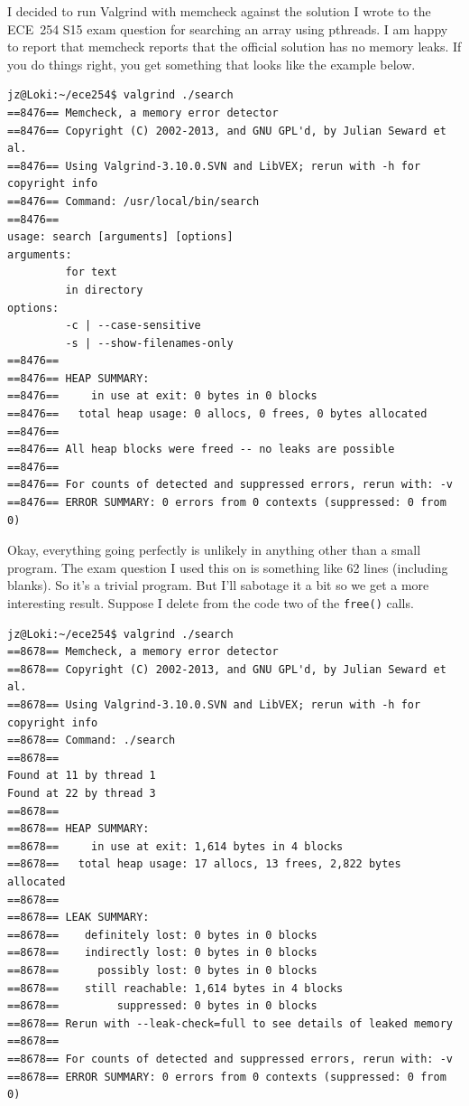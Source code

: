 \documentclass[a4paper]{report}
\begin{document}
I decided to run Valgrind with memcheck against the solution I wrote to the ECE~254 S15 exam question for searching an array using pthreads. I am happy to report that memcheck reports that the official solution has no memory leaks. If you do things right, you get something that looks like the example below. 
\begin{verbatim}
jz@Loki:~/ece254$ valgrind ./search
==8476== Memcheck, a memory error detector
==8476== Copyright (C) 2002-2013, and GNU GPL'd, by Julian Seward et al.
==8476== Using Valgrind-3.10.0.SVN and LibVEX; rerun with -h for copyright info
==8476== Command: /usr/local/bin/search
==8476== 
usage: search [arguments] [options]
arguments:
         for text
         in directory
options:
         -c | --case-sensitive
         -s | --show-filenames-only
==8476== 
==8476== HEAP SUMMARY:
==8476==     in use at exit: 0 bytes in 0 blocks
==8476==   total heap usage: 0 allocs, 0 frees, 0 bytes allocated
==8476== 
==8476== All heap blocks were freed -- no leaks are possible
==8476== 
==8476== For counts of detected and suppressed errors, rerun with: -v
==8476== ERROR SUMMARY: 0 errors from 0 contexts (suppressed: 0 from 0)
\end{verbatim}

Okay, everything going perfectly is unlikely in anything other than a small program. The exam question I used this on is something like 62 lines (including blanks). So it's a trivial program. But I'll sabotage it a bit so we get a more interesting result. Suppose I delete from the code two of the \texttt{free()} calls.

\begin{verbatim}
jz@Loki:~/ece254$ valgrind ./search 
==8678== Memcheck, a memory error detector
==8678== Copyright (C) 2002-2013, and GNU GPL'd, by Julian Seward et al.
==8678== Using Valgrind-3.10.0.SVN and LibVEX; rerun with -h for copyright info
==8678== Command: ./search
==8678== 
Found at 11 by thread 1 
Found at 22 by thread 3 
==8678== 
==8678== HEAP SUMMARY:
==8678==     in use at exit: 1,614 bytes in 4 blocks
==8678==   total heap usage: 17 allocs, 13 frees, 2,822 bytes allocated
==8678== 
==8678== LEAK SUMMARY:
==8678==    definitely lost: 0 bytes in 0 blocks
==8678==    indirectly lost: 0 bytes in 0 blocks
==8678==      possibly lost: 0 bytes in 0 blocks
==8678==    still reachable: 1,614 bytes in 4 blocks
==8678==         suppressed: 0 bytes in 0 blocks
==8678== Rerun with --leak-check=full to see details of leaked memory
==8678== 
==8678== For counts of detected and suppressed errors, rerun with: -v
==8678== ERROR SUMMARY: 0 errors from 0 contexts (suppressed: 0 from 0)
\end{verbatim}
\end{document}
